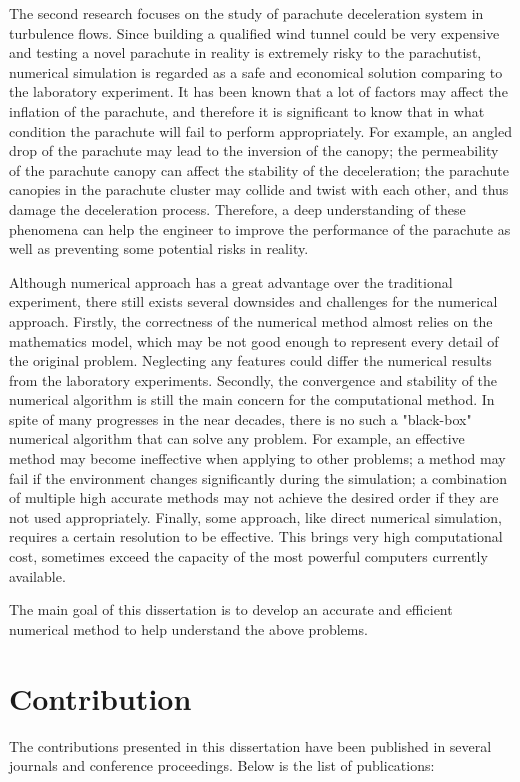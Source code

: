 The second research focuses on the study of parachute deceleration system in turbulence flows.
Since building a qualified wind tunnel could be very expensive and testing a novel parachute in 
reality is extremely risky to the parachutist, numerical simulation is regarded as a safe 
and economical solution comparing to the laboratory experiment. It has been known that a lot of factors
may affect the inflation of the parachute, and therefore it is significant to know that in what condition
the parachute will fail to perform appropriately. For example, an angled drop of the parachute may lead
to the inversion of the canopy; the permeability of the parachute canopy can affect the stability of the 
deceleration; the parachute canopies in the parachute cluster may collide and twist with each other, and thus 
damage the deceleration process. Therefore, a deep understanding of these phenomena can help the engineer to 
improve the performance of the parachute as well as preventing some potential risks in reality.

Although numerical approach has a great advantage over the traditional experiment, there still exists 
several downsides and challenges for the numerical approach. Firstly, the correctness of the numerical method almost 
relies on the mathematics model, which may be not good enough to represent every detail of 
the original problem. Neglecting any features could differ the numerical results from the laboratory experiments. 
Secondly, the convergence and stability of the numerical algorithm
is still the main concern for the computational method. In spite of many progresses in the near decades, 
there is no such a "black-box" numerical algorithm that can solve any problem. For example, an effective 
method may become ineffective when applying to other problems; a method may fail if the environment changes 
significantly during the simulation; a combination of multiple high accurate 
methods may not achieve the desired order if they are not used appropriately.
Finally, some approach, like direct numerical simulation, requires a certain resolution to be effective.
This brings very high computational cost, sometimes exceed the capacity of the most powerful computers currently 
available.

The main goal of this dissertation is to develop an accurate and efficient numerical method to help understand 
the above problems. 
\section{Contribution}
The contributions presented in this dissertation have been published in several journals 
and conference proceedings. Below is the list of publications:

